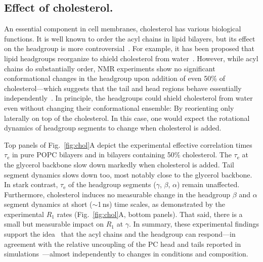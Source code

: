 \documentclass[journal=jcisd8,manuscript=article,layout=twocolumn]{achemso}
\begin{document}
\subsection*{Effect of cholesterol.}
An essential component in cell membranes, cholesterol has various biological functions.
It is well known to order the acyl chains in lipid bilayers, but
its effect on the headgroup is more controversial~\cite{huang99,ferreira13}.
For example, it has been proposed that lipid headgroups
reorganize to shield cholesterol from water~\cite{huang99}. However, while acyl chains do substantially order,
NMR experiments show no significant conformational changes in the headgroup upon addition
of even 50\% of cholesterol---which
suggests that the tail and head regions behave essentially independently~\cite{ferreira13,botan15}.
In principle, the headgroups could shield cholesterol from water even
without changing their conformational ensemble: By reorienting only laterally on
top of the cholesterol. In this case, one would expect the rotational dynamics of headgroup segments to change when cholesterol is added.

Top panels of Fig.~\ref{fig:chol}A depict the experimental effective correlation times $\tau_\mathrm e$ in pure POPC bilayers and in bilayers containing 50\% cholesterol. The $\tau_\mathrm e$ at the glycerol backbone
slow down markedly when cholesterol is added. Tail segment dynamics slows down too, most notably close to the glycerol backbone.
%
In stark contrast,
$\tau_\mathrm e$ of the headgroup segments ($\gamma$, $\beta$, $\alpha$)
remain unaffected.
%
Furthermore, cholesterol induces no measurable change in the
headgroup $\beta$ and $\alpha$ segment
dynamics at short ($\sim$1\,ns) time scales, as
demonstrated by
the experimental $R_{1}$ rates (Fig.~\ref{fig:chol}A, bottom panels).
That said,
there is a small but measurable impact on $R_1$ at $\gamma$.
%
In summary, these experimental findings
support the idea~\cite{Antila:2020a} that the acyl chains and the headgroup can respond---in
agreement with the relative uncoupling of the PC head and tails reported in simulations~\cite{Klauda:2008a}---almost independently to changes in conditions and composition.
\end{document}
